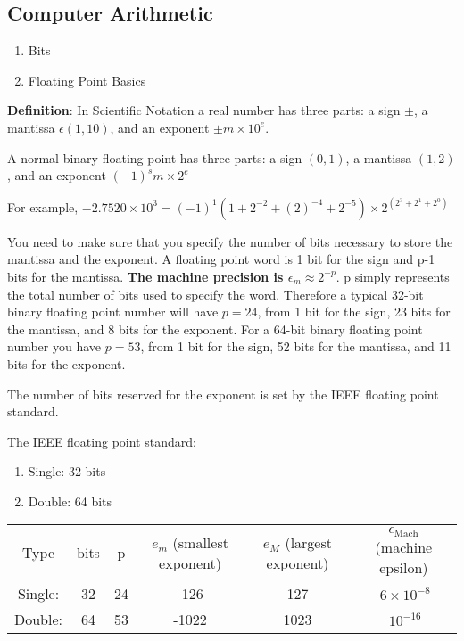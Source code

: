 \documentclass{article}
\newcommand{\n}{\newline}
\begin{document}
	\subsection{Computer Arithmetic}
	\begin{flushleft}
	\begin{enumerate}
		\item Bits 
		\item Floating Point Basics \n
	\end{enumerate} 
	
	\textbf{Definition}: In Scientific Notation a real number has three parts: a sign $\pm$, a mantissa $\epsilon(1,10)$, and an exponent $\pm m\times10^{e}$. \n
	
	A normal binary floating point has three parts: a sign $(0,1)$, a mantissa $(1,2)$, and an exponent $(-1)^{s}m\times2^{e}$ \n
	
	For example, $-2.7520\times10^{3}=(-1)^{1}(1+2^{-2}+(2)^{-4}+2^{-5})\times2^{(2^{3}+2^{1}+2^{0})}$  \n
	
	You need to make sure that you specify the number of bits necessary to store the mantissa and the exponent.  A floating point word is 1 bit for the sign and p-1 bits for the mantissa.  \textbf{The machine precision is $\epsilon_{m}\approx2^{-p}$}.  p simply represents the total number of bits used to specify the word.  Therefore a typical 32-bit binary floating point number will have $p=24$, from 1 bit for the sign, 23 bits for the mantissa, and 8 bits for the exponent.  For a 64-bit binary floating point number you have $p=53$, from 1 bit for the sign, 52 bits for the mantissa, and 11 bits for the exponent.   \n
	
	The number of bits reserved for the exponent is set by the IEEE floating point standard. \n
	
	The IEEE floating point standard: \n
	
	\begin{enumerate}
		\item Single: 32 bits
		\item Double: 64 bits\n
	\end{enumerate}
	
	\begin{tabular}{c | c | c | c | c | c}
		Type & bits & p & $e_{m}$ (smallest exponent) & $e_{M}$ (largest exponent) & $\epsilon_{\text{Mach}} $ (machine epsilon) \\
		Single: & 32 & 24 & -126 & 127 & $~6\times10^{-8}$ \\
		Double: & 64 & 53 & -1022 & 1023 & $~10^{-16}$ \\
	\end{tabular}
	

\end{flushleft}
\end{document}
